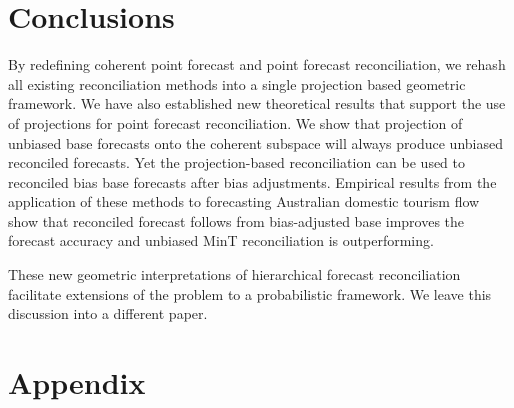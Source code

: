 \documentclass[12pt]{article}
\theoremstyle{definition}
\theoremstyle{property}
\begin{document}
	\section{Conclusions} \label{sec:conclusions}
	
	By redefining coherent point forecast and point forecast reconciliation, we rehash all existing reconciliation methods into a single projection based geometric framework. We have also established new theoretical results that support the use of projections for point forecast reconciliation. We show that projection of unbiased base forecasts onto the coherent subspace will always produce unbiased reconciled forecasts. Yet the projection-based reconciliation can be used to reconciled bias base forecasts after bias adjustments. Empirical results from the application of these methods to forecasting Australian domestic tourism flow show that reconciled forecast follows from bias-adjusted base improves the forecast accuracy and unbiased MinT reconciliation is outperforming. 
	
	
	These new geometric interpretations of hierarchical forecast reconciliation facilitate extensions of the problem to a probabilistic framework. We leave this discussion into a different paper. 	
	
	\newpage
	\section{Appendix}
	

	
	\newpage
	
	
	
	
	
\end{document}

